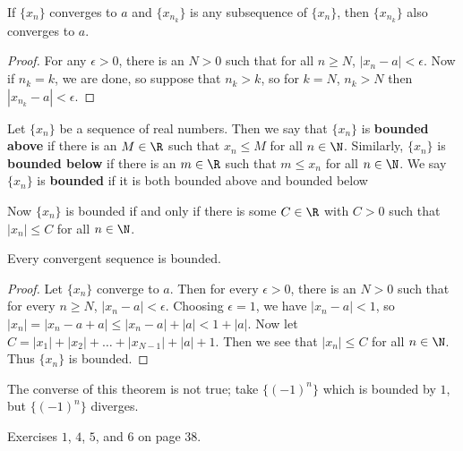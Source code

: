 \begin{remark}
    If $\{x_n\}$ converges to  $a$ and $\{x_{n_k}\}$ is any subsequence of $\{x_n\}$, then  $\{x_{n_k}\}$ also converges 
    to  $a$.
\end{remark} 
\begin{proof}
   For any $\epsilon>0$, there is an  $N>0$ such that for all $n \geq N$,  $|x_n-a|<\epsilon$. Now if  $n_k=k$, we are done, 
   so suppose that $n_k>k$, so for  $k=N$,  $n_k>N$ then $|x_{n_k}-a|< \epsilon$.
\end{proof}

\begin{definition}
    Let $\{x_n\}$ be a sequence of real numbers. Then we say that $\{x_n\}$ is \textbf{bounded above} if there is an $M \in \R$ 
    such that $x_n \leq M$ for all $n \in \N$. Similarly, $\{x_n\}$ is \textbf{bounded below} if there is an $m \in \R$ such 
    that  $m \leq x_n$ for all $n \in \N$. We say $\{x_n\}$ is \textbf{bounded} if it is both bounded above and bounded 
    below
\end{definition}

Now $\{x_n\}$ is bounded if and only if there is some  $C \in \R$ with $C>0$ such that  $|x_n| \leq C$ for all $n \in \N$.

\begin{theorem}
    Every convergent sequence is bounded.
\end{theorem}
\begin{proof}
    Let $\{x_n\}$ converge to $a$. Then for every $\epsilon>0$, there is an  $N>0$ such that for every  $n \geq N$,  
$|x_n-a|<\epsilon$. Choosing  $\epsilon=1$, we have  $|x_n-a|<1$, so  $|x_n|=|x_n-a+a| \leq |x_n-a|+|a|<1+|a|$. Now let  
$C=|x_1|+|x_2|+\dots+|x_{N-1}|+|a|+1$. Then we see that $|x_n| \leq C$ for all  $n \in \N$. Thus  $\{x_n\}$ is bounded. 
\end{proof}

The converse of this theorem is not true; take $\{(-1)^n\}$ which is bounded by  $1$, but  $\{(-1)^n\}$ diverges.

\begin{HW}
    Exercises  $1$,  $4$,  $5$,  and $6$ on page  $38$.
\end{HW}
